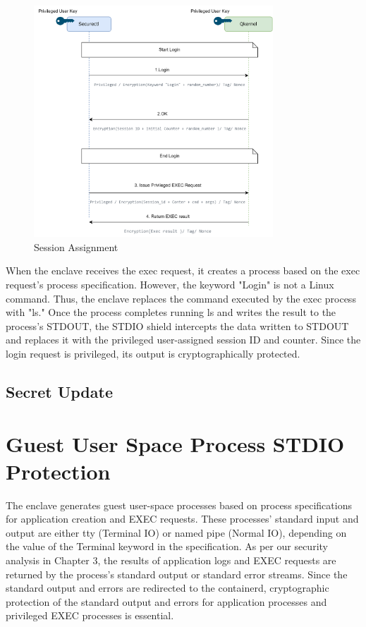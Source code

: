 \begin{figure}[htp]
    \centering
    \includegraphics[width=0.8\textwidth]{images/session_base_auth.png}
    \caption[Session Assignment]{Session Assignment}
    \label{fig:session_base_auth}
\end{figure}

When the enclave receives the exec request, it creates a process based on the exec request's process specification. However, the keyword "Login" is not a Linux command. Thus, the enclave replaces the command executed by the exec process with "ls." 
Once the process completes running ls and writes the result to the process's STDOUT, the STDIO shield intercepts the data written to STDOUT and replaces it with the privileged user-assigned session ID and counter. Since the login request is 
privileged, its output is cryptographically protected.

\subsection{Secret Update}


\section{Guest User Space Process STDIO Protection}
\label{sec:design_STDIO_PROTECTION}
The enclave generates guest user-space processes based on process specifications for application creation and EXEC requests. These processes' standard input and output are either tty (Terminal IO) or named pipe (Normal IO), depending on the value of 
the Terminal keyword in the specification. As per our security analysis in Chapter 3, the results of application logs and EXEC requests are returned by the process's standard output or standard error streams. Since the standard output and errors 
are redirected to the containerd, cryptographic protection of the standard output and errors for application processes and privileged EXEC processes is essential.

